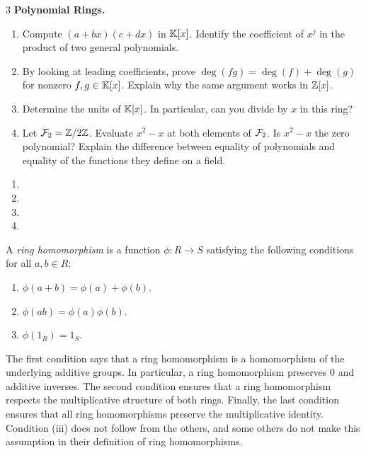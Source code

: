 \documentclass[Notebook.tex]{subfiles}
\begin{document}
\hrulefill

\begin{problem}{3}\label{r:polys}
	\textbf{Polynomial Rings.}
	\begin{enumerate}[label=(\alph*),ref=\theenumi\alph*]
		\item Compute $(a+bx)(c+dx)$ in $\mathbb K[x]$. Identify the coefficient of $x^j$ in the product of two general polynomials.
		\item By looking at leading coefficients, prove $\deg(fg)=\deg(f)+\deg(g)$ for nonzero $f,g\in \mathbb K[x]$. Explain why the same argument works in $\mathbb Z[x]$.
		\item Determine the units of $\mathbb K[x]$. In particular, can you divide by $x$ in this ring?
		\item Let $\mathcal{F}_2=\mathbb Z/2\mathbb Z$. Evaluate $x^2-x$ at both elements of $\mathcal{F}_2$. Is $x^2-x$ the zero polynomial? Explain the difference between equality of polynomials and equality of the functions they define on a field.
	\end{enumerate}
\end{problem}

\begin{solution}
	\bbni
	\begin{enumerate}[label=(\alph*),ref=\theenumi\alph*]
		\item
		\item
		\item
		\item
	\end{enumerate}
\end{solution}

\newpage

A \emph{ring homomorphism} is a function $\phi:R\to S$ satisfying the following conditions for all $a,b\in R$:
\begin{enumerate}[label=(\roman*)]
	\item $\phi(a+b)=\phi(a)+\phi(b)$.
	\item $\phi(ab)=\phi(a)\phi(b)$.
	\item $\phi(1_R)=1_S$.
\end{enumerate}
The first condition says that a ring homomorphism is a homomorphism of the underlying additive groups. In particular, a ring homomorphism preserves $0$ and additive inverses. The second condition ensures that a ring homomorphism respects the multiplicative structure of both rings. Finally, the last condition ensures that all ring homomorphisms preserve the multiplicative identity. Condition (iii) does not follow from the others, and some others do not make this assumption in their definition of ring homomorphisms.
\end{document}
